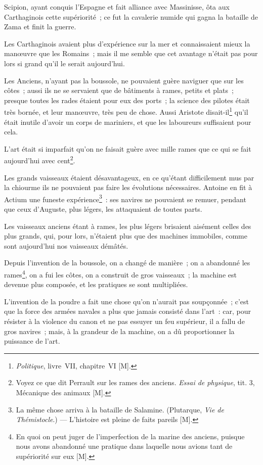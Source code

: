 \documentclass[french,twoside]{book} %
\begin{document}
Scipion, ayant conquis l’Espagne et fait alliance avec Massinisse, ôta aux Carthaginois cette supériorité ; ce fut la cavalerie numide qui gagna la bataille de Zama et finit la guerre.\par
Les Carthaginois avaient plus d’expérience sur la mer et connaissaient mieux la manœuvre que les Romains ; mais il me semble que cet avantage n’était pas pour lors si grand qu’il le serait aujourd’hui.\par
Les Anciens, n’ayant pas la boussole, ne pouvaient guère naviguer que sur les côtes ; aussi ils ne se servaient que de bâtiments à rames, petits et plats ; presque toutes les rades étaient pour eux des ports ; la science des pilotes était très bornée, et leur manœuvre, très peu de chose. Aussi Aristote disait-il\footnote{{\itshape Politique}, livre VII, chapitre VI [M].} qu’il était inutile d’avoir un corps de mariniers, et que les laboureurs suffisaient pour cela.\par
L’art était si imparfait qu’on ne faisait guère avec mille rames que ce qui se fait aujourd’hui avec cent\footnote{Voyez ce que dit Perrault sur les rames des anciens. {\itshape Essai de physique}, tit. 3, Mécanique des animaux [M].}.\par
Les grands vaisseaux étaient désavantageux, en ce qu’étant difficilement mus par la chiourme ils ne pouvaient pas faire les évolutions nécessaires. Antoine en fit à Actium une funeste expérience\footnote{La même chose arriva à la bataille de Salamine. (Plutarque, {\itshape Vie de Thémistocle}.) — L’histoire est pleine de faits pareils [M].} : ses navires ne pouvaient se remuer, pendant que ceux d’Auguste, plus légers, les attaquaient de toutes parts.\par
Les vaisseaux anciens étant à rames, les plus légers brisaient aisément celles des plus grands, qui, pour lors, n’étaient plus que des machines immobiles, comme sont aujourd’hui nos vaisseaux démâtés.\par
Depuis l’invention de la boussole, on a changé de manière ; on a abandonné les rames\footnote{En quoi on peut juger de l’imperfection de la marine des anciens, puisque nous avons abandonné une pratique dans laquelle nous avions tant de supériorité sur eux [M].}, on a fui les côtes, on a construit de gros vaisseaux ; la machine est devenue plus composée, et les pratiques se sont multipliées.\par
L’invention de la poudre a fait une chose qu’on n’aurait pas soupçonnée ; c’est que la force des armées navales a plus que jamais consisté dans l’art : car, pour résister à la violence du canon et ne pas essuyer un feu supérieur, il a fallu de gros navires ; mais, à la grandeur de la machine, on a dû proportionner la puissance de l’art.\par
\end{document}
